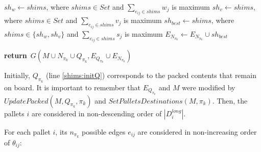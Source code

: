 \documentclass[preprint]{elsarticle}
\renewcommand{\Return}{\State \textbf{return}~}
\begin{document}
\begin{algorithm}[H]
\begin{algorithmic}[1]
			\State $sh_w \gets shims$, where $shims \in Set$ and $\sum_{e_{ij} \in shims} w_j$\/ is maximum  \label{best_weight}		
			\State $sh_v \gets shims$, where $shims \in Set$ and $\sum_{e_{ij} \in shims} v_j$\/ is maximum \label{best_volume}
			\State $sh_{best} \gets shims$, where $shims \in \{sh_w, sh_v\}$\/ and $\sum_{e_{ij} \in shims} s_j$\/ is maximum \label{best_score}
			\State $E_{N_{\pi_k}} \gets E_{N_{\pi_k}} \cup sh_{best}$ \label{shims:endthird}  

		\EndFor
		
		\Return $G(M \cup N_{\pi_k} \cup Q_{\pi_k}, E_{Q_{\pi_k}} \cup E_{N_{\pi_k}})$
		
		\EndProcedure
	\end{algorithmic}
\end{algorithm}

Initially, $Q_{\pi_k}$\/ (line \ref{shims:initQ}) corresponds to the packed contents that remain on board. It is important to remember that $E_{Q_{\pi_k}}$\/ and $M$\/ were modified by $UpdatePacked(M, Q_{\pi_k}, \pi_k)$ and $SetPalletsDestinations(M, \pi_k)$. Then, the pallets $i$\/ are considered in non-descending order of $|D_i^{long}|$. 

For each pallet $i$, its $n_{\pi_k}$\/ possible edges $e_{ij}$\/ are considered in non-increasing order of $\theta_{ij}$:
\end{document}
